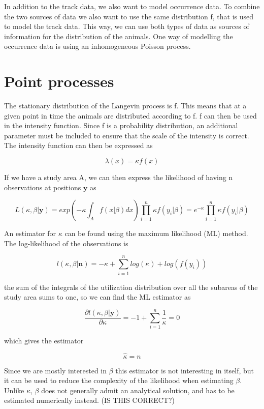 


In addition to the track data, we also want to model occurrence data. To combine the two sources of data we also want to use the same distribution f, that is used to model the track data. This way, we can use both types of data as sources of information for the distribution of the animals. One way of modelling the occurrence data is using an inhomogeneous Poisson process.

\section{Point processes}



The stationary distribution of the Langevin process is f. This means that at a given point in time the animals are distributed according to f. f can then be used in the intensity function. Since f is a probability distribution, an additional parameter must be included to ensure that the scale of the intensity is correct. The intensity function can then be expressed as

$$\lambda(x) = \kappa f(x)$$

If we have a study area A, we can then express the likelihood of having n observations at positions $\textbf{y}$ as

\begin{equation}
    L(\kappa, \beta|\textbf{y}) =  exp(-\kappa \int_{A}  f(x|\beta)dx)\prod_{i=1}^n \kappa f(y_i|\beta) = e^{-\kappa}\prod_{i=1}^n \kappa   f(y_i|\beta)
\end{equation}

An estimator for $\kappa$ can be found using the maximum likelihood (ML) method. The log-likelihood of the observations is

$$
l(\kappa, \beta|\textbf{n}) = -\kappa + \sum_{i=1}^n log(\kappa) + log(f(y_i))
$$

the sum of the integrals of the utilization distribution over all the subareas of the study area sums to one, so we can find the ML estimator as

$$
\frac{\partial l(\kappa, \beta|\textbf{y})}{\partial \kappa} = -1 +\sum_{i=1}^n \frac{1}{\kappa}  = 0
$$

which gives the estimator

$$
\hat{\kappa} = n
$$

Since we are mostly interested in $\beta$ this estimator is not interesting in itself, but it can be used to reduce the complexity of the likelihood when estimating $\beta$. Unlike $\kappa$, $\beta$ does not generally admit an analytical solution, and has to be estimated numerically instead. (IS THIS CORRECT?)

